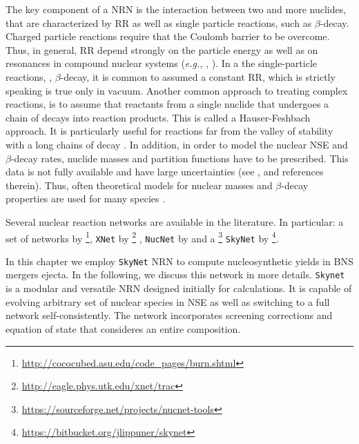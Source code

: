 The key component of a \ac{NRN} is the interaction between two and more nuclides, that are characterized by \ac{RR} as well as single particle reactions, such as $\beta$-decay.
Charged particle reactions require that the Coulomb barrier to be overcome. Thus, in general, \ac{RR} depend strongly on the particle energy as well as on resonances in compound nuclear systems (\textit{e.g.,} \cite{Clayton:1968}, ). 
In a the single-particle reactions, \eg, $\beta$-decay, it is common to assumed a constant \ac{RR}, which is strictly speaking is true only in vacuum. Another common approach to treating complex reactions, is to assume that reactants from a single nuclide that undergoes a chain of decays into reaction products. This is called a Hauser-Feshbach approach. It is particularly useful for reactions far from the valley of stability with a long chains of decay \citep{Hauser:1952,Rauscher:2000fx,Goriely:2008zu}. 
In addition, in order to model the nuclear \ac{NSE} and $\beta$-decay rates, nuclide masses and partition functions \citep{Arcones:2010dz,Brett:2012jn,Mendoza-Temis:2014mja,Mumpower:2015ova} have to be prescribed. This data is not fully available and have large uncertainties (see \eg, \citet{Lunney:2003,Schatz:2013,Mumpower:2015ova} and references therein). Thus, often theoretical models for nuclear masses and $\beta$-decay properties are used for many species \citep{Lunney:2003,Moller:2003,Mumpower:2015ova}. 

Several nuclear reaction networks are available in the literature. In particular: a set of networks by 
\citet{Timmes:1999} \footnote{\url{http://cococubed.asu.edu/code_pages/burn.shtml}}, 
\texttt{XNet} by \citet{Hix:1999} \footnote{\url{http://eagle.phys.utk.edu/xnet/trac}} , 
\texttt{NucNet} by \citet{Meyer:2007} and a  \footnote{\url{https://sourceforge.net/projects/nucnet-tools}}
\texttt{SkyNet} by \citet{Lippuner:2015gwa} \footnote{\url{https://bitbucket.org/jlippuner/skynet}}.

In this chapter we employ \texttt{SkyNet} \ac{NRN} to compute nucleosynthetic yields in \ac{BNS} mergers ejecta. In the following, we discuss this network in more details.
\texttt{Skynet} is a modular and versatile \ac{NRN} designed initially for \rproc{} \nuc{} calculations. It is capable of evolving arbitrary set of nuclear
species in \ac{NSE} as well as switching to a full network self-consistently. The network incorporates screening corrections and equation of state that consideres an entire composition.

